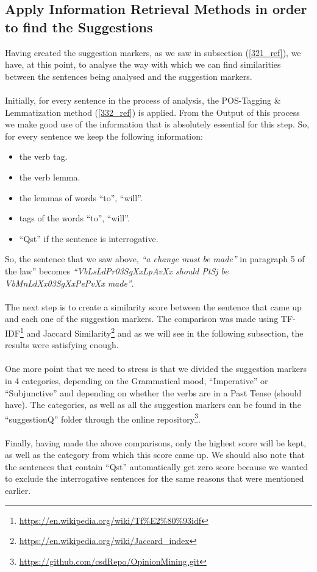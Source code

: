 \subsection{Apply Information Retrieval Methods in order to find the Suggestions}\label{333_ref}
Having created the suggestion markers, as we saw in subsection (\ref{321_ref}), we have, at this point, to analyse the way with which we can find similarities between the sentences being analysed and the suggestion markers.\\
\\
Initially, for every sentence in the process of analysis, the POS-Tagging \& Lemmatization method (\ref{332_ref}) is applied. From the Output of this process we make good use of the information that is absolutely essential for this step. So, for every sentence we keep the following information:\\
\begin{itemize}

	\item the verb tag.
	\item the verb lemma.
	\item the lemmas of words ``to'', ``will''.
	\item tags of the words ``to'', ``will''.
	\item ``Qst'' if the sentence is interrogative.\\

\end{itemize}

So, the sentence that we saw above, \textit{``a change must be made''} in paragraph 5 of the law'' becomes \textit{``VbLsLdPr03SgXxLpAvXx should PtSj be VbMnLdXx03SgXxPePvXx made''}.\\
\\
The next step is to create a similarity score between the sentence that came up and each one of the suggestion markers. The comparison was made using TF-IDF\footnote{\url{https://en.wikipedia.org/wiki/Tf\%E2\%80\%93idf}} and Jaccard Similarity\footnote{\url{https://en.wikipedia.org/wiki/Jaccard_index}} and as we will see in the following subsection, the results were satisfying enough.\\
\\
One more point that we need to stress is that we divided the suggestion markers in 4 categories, depending on the Grammatical mood, ``Imperative'' or ``Subjunctive'' and depending on whether the verbs are in a Past Tense (should have). The categories, as well as all the suggestion markers can be found in the ``suggestionQ'' folder through the online repository\footnote{\url{https://github.com/csdRepo/OpinionMining.git}}.\\
\\
Finally, having made the above comparisons, only the highest score will be kept, as well as the category from which this score came up. We should also note that the sentences that contain ``Qst'' automatically get zero score because we wanted to exclude the interrogative sentences for the same reasons that were mentioned earlier.

